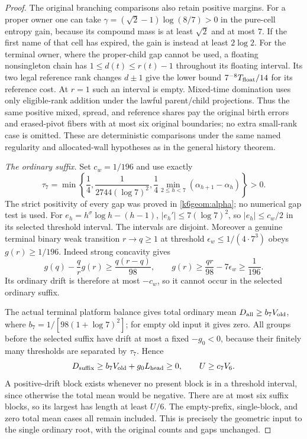 \begin{proof}
The original branching comparisons also retain positive margins.
For a proper owner one can take
$\gamma=(\sqrt2-1)\log(8/7)>0$ in the pure-cell entropy gain,
because its compound mass is at least $\sqrt2$ and at most $7$.
If the first name of that cell has expired, the gain is instead at
least $2\log2$. For the terminal owner, where the proper-child gap
cannot be used, a floating nonsingleton chain has
$1\leq d(t)\leq r(t)-1$ throughout its floating interval. Its two
legal reference rank changes $d\pm1$ give the lower bound
$7^{-8}T_{\rm float}/14$ for its reference cost. At $r=1$ such an
interval is empty. Mixed-time domination uses only eligible-rank
addition under the lawful parent/child projections. Thus the same
positive mixed, spread, and reference shares pay the original birth
errors and erased-pivot fibers with at most six original boundaries;
no extra small-rank case is omitted. These are deterministic comparisons
under the same named regularity and allocated-wall hypotheses as in
the general history theorem.

\emph{The ordinary suffix.}
Set $c_w=1/196$ and use exactly
\[
 \tau_7=\min\left\{\frac14,
    \frac1{2744(\log7)^2},
    \frac14\min_{2\leq h<7}(\alpha_{h+1}-\alpha_h)\right\}>0.
\]
The strict positivity of every gap was proved in
\eqref{k6geom:alpha}; no numerical gap test is used.
For $e_h=h^\sigma\log h-(h-1)$,
$|e_h'|\leq7(\log7)^2$, so $|e_h|\leq c_w/2$ in its
selected threshold interval. The intervals are disjoint.
Moreover a genuine terminal binary weak transition $r\to q\geq1$
at threshold $\epsilon_w\leq1/(4\cdot7^3)$ obeys
$g(r)\geq1/196$. Indeed strong concavity gives
\[
 g(q)-\frac qr g(r)\geq\frac{q(r-q)}{98},
 \qquad g(r)\geq\frac{qr}{98}-7\epsilon_w\geq\frac1{196}.
\]
Its ordinary drift is therefore at most $-c_w$, so it cannot occur
in the selected ordinary suffix.

The actual terminal platform balance gives total ordinary mean
$D_{\rm all}\geq b_7V_{\rm old}$, where
$b_7=1/[98(1+\log7)^2]$; for empty old input it gives zero.
All groups before the selected suffix have drift at most a fixed
$-g_0<0$, because their finitely many thresholds are separated by
$\tau_7$. Hence
\[
 D_{\rm suffix}\geq b_7V_{\rm old}+g_0L_{\rm head}\geq0,
 \qquad U\geq c_7V_6.
\]
A positive-drift block exists whenever no present block is in a
threshold interval, since otherwise the total mean would be negative.
There are at most six suffix blocks, so its largest has length at
least $U/6$. The empty-prefix, single-block, and zero total mean cases
all remain included. This is precisely the geometric input to the
single ordinary root, with the original counts and gaps unchanged.
\end{proof}

